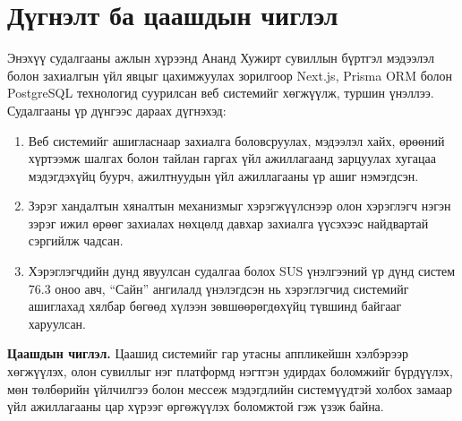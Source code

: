 \section{Дүгнэлт ба цаашдын чиглэл}

Энэхүү судалгааны ажлын хүрээнд Ананд Хужирт сувиллын бүртгэл мэдээлэл болон захиалгын үйл явцыг цахимжуулах зорилгоор Next.js, Prisma ORM болон PostgreSQL технологид суурилсан веб системийг хөгжүүлж, туршин үнэллээ. Судалгааны үр дүнгээс дараах дүгнэхэд:
\begin{enumerate}
    \item Веб системийг ашигласнаар захиалга боловсруулах, мэдээлэл хайх, өрөөний хүртээмж шалгах болон тайлан гаргах үйл ажиллагаанд зарцуулах хугацаа мэдэгдэхүйц буурч, ажилтнуудын үйл ажиллагааны үр ашиг нэмэгдсэн.
    \item Зэрэг хандалтын хяналтын механизмыг хэрэгжүүлснээр олон хэрэглэгч нэгэн зэрэг ижил өрөөг захиалах нөхцөлд давхар захиалга үүсэхээс найдвартай сэргийлж чадсан.
    \item Хэрэглэгчдийн дунд явуулсан судалгаа болох SUS үнэлгээний үр дүнд систем 76.3 оноо авч, ``Сайн'' ангилалд үнэлэгдсэн нь хэрэглэгчид системийг ашиглахад хялбар бөгөөд хүлээн зөвшөөрөгдөхүйц түвшинд байгааг харуулсан.\end{enumerate}

\textbf{Цаашдын чиглэл.} Цаашид системийг гар утасны аппликейшн хэлбэрээр хөгжүүлэх, олон сувиллыг нэг платформд нэгтгэн удирдах боломжийг бүрдүүлэх, мөн төлбөрийн үйлчилгээ болон мессеж мэдэгдлийн системүүдтэй холбох замаар үйл ажиллагааны цар хүрээг өргөжүүлэх боломжтой гэж үзэж байна.